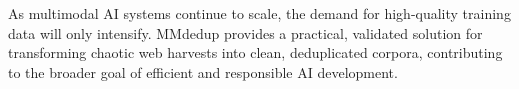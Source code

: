 \documentclass[sigconf, nonacm]{acmart}
\begin{document}
As multimodal AI systems continue to scale, the demand for high-quality training data will only intensify. MMdedup provides a practical, validated solution for transforming chaotic web harvests into clean, deduplicated corpora, contributing to the broader goal of efficient and responsible AI development.

\end{document}
